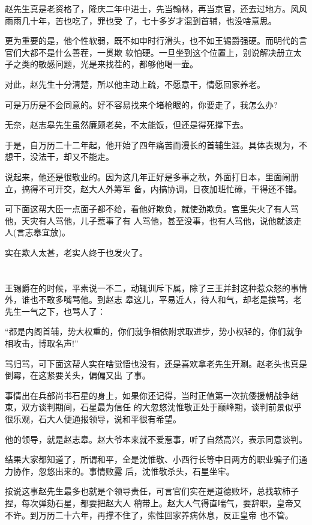 \documentclass[11pt,a4paper,onecolumn]{article}
\begin{document}
赵先生真是老资格了，隆庆二年中进士，先当翰林，再当京官，还去过地方。风风雨雨几十年，苦也吃了，罪也受
了，七十多岁才混到首辅，也没啥意思。

更为重要的是，他个性软弱，既不如申时行滑头，也不如王锡爵强硬。而明代的言官们大都不是什么善茬，一贯欺
软怕硬。一旦坐到这个位置上，别说解决册立太子之类的敏感问题，光是来找茬的，都够他喝一壶。

对此，赵先生十分清楚，所以他主动上疏，不愿意干，情愿回家养老。

可是万历是不会同意的。好不容易找来个堵枪眼的，你要走了，我怎么办?

无奈，赵志皋先生虽然廉颇老矣，不太能饭，但还是得死撑下去。

于是，自万历二十二年起，他开始了四年痛苦而漫长的首辅生涯。具体表现为，不想干，没法干，却又不能走。

说起来，他还是很敬业的。因为这几年正好是多事之秋，外面打日本，里面闹册立，搞得不可开交，赵大人外筹军
备，内搞协调，日夜加班忙碌，干得还不错。

可下面这帮大臣一点面子都不给，看他好欺负，就使劲欺负。宫里失火了有人骂他，天灾有人骂他，儿子惹事了有
人骂他，甚至没事，也有人骂他，说他就该走人(言志皋宜放)。

实在欺人太甚，老实人终于也发火了。

\section[\thesection]{}

王锡爵在的时候，平素说一不二，动辄训斥下属，除了三王并封这种惹众怒的事情外，谁也不敢多嘴骂他。到赵志
皋这儿，平易近人，待人和气，却老是挨骂，老先生一气之下，也骂人了：

``都是内阁首辅，势大权重的，你们就争相依附求取进步，势小权轻的，你们就争相攻击，博取名声!''

骂归骂，可下面这帮人实在啥觉悟也没有，还是喜欢拿老先生开涮。赵老头也真是倒霉，在这紧要关头，偏偏又出
了事。

事情出在兵部尚书石星的身上，如果你还记得，当时正值第一次抗倭援朝战争结束，双方谈判期间，石星最为信任
的大忽悠沈惟敬正处于巅峰期，谈判前景似乎很乐观，石大人便通报领导，说和平很有希望。

他的领导，就是赵志皋。赵大爷本来就不爱惹事，听了自然高兴，表示同意谈判。

结果大家都知道了，所谓和平，全是沈惟敬、小西行长等中日两方的职业骗子们通力协作，忽悠出来的。事情败露
后，沈惟敬杀头，石星坐牢。

按说这事赵先生最多也就是个领导责任，可言官们实在是道德败坏，总找软柿子捏，每次弹劾石星，都要把赵大人
稍带上。赵大人气得直喘气，要辞职，皇帝又不许。到万历二十六年，再撑不住了，索性回家养病休息，反正皇帝
也不管。
\end{document}
